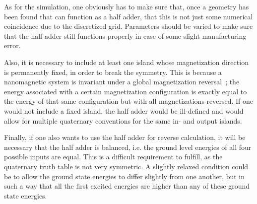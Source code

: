 \documentclass[11pt,a4paper,english]{article}
\begin{document}
As for the simulation, one obviously has to make sure that, once a geometry has been found that can function as a half adder, that this is not just some numerical coincidence due to the discretized grid. Parameters should be varied to make sure that the half adder still functions properly in case of some slight manufacturing error. \par
Also, it is necessary to include at least one island whose magnetization direction is permanently fixed, in order to break the symmetry. This is because a nanomagnetic system is invariant under a global magnetization reversal~\cite{GYP-18}; the energy associated with a certain magnetization configuration is exactly equal to the energy of that same configuration but with all magnetizations reversed. If one would not include a fixed island, the half adder would be ill-defined and would allow for multiple quaternary conventions for the same in- and output islands. \par
Finally, if one also wants to use the half adder for reverse calculation, it will be necessary that the half adder is balanced, i.e. the ground level energies of all four possible inputs are equal. This is a difficult requirement to fulfill, as the quaternary truth table is not very symmetric. A slightly relaxed condition could be to allow the ground state energies to differ slightly from one another, but in such a way that all the first excited energies are higher than any of these ground state energies. \par

\end{document}
